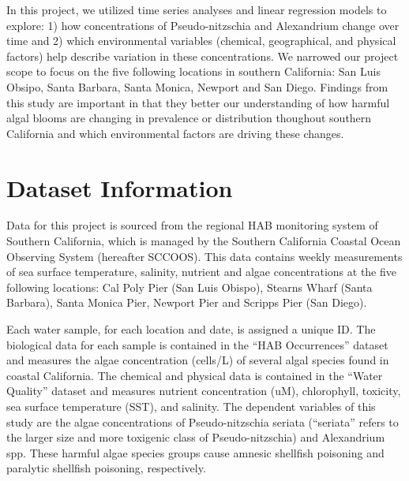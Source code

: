 \documentclass[
  12pt,
]{article}
\begin{document}
In this project, we utilized time series analyses and linear regression
models to explore: 1) how concentrations of Pseudo-nitzschia and
Alexandrium change over time and 2) which environmental variables
(chemical, geographical, and physical factors) help describe variation
in these concentrations. We narrowed our project scope to focus on the
five following locations in southern California: San Luis Obsipo, Santa
Barbara, Santa Monica, Newport and San Diego. Findings from this study
are important in that they better our understanding of how harmful algal
blooms are changing in prevalence or distribution thoughout southern
California and which environmental factors are driving these changes.

\newpage

\hypertarget{dataset-information}{%
\section{Dataset Information}\label{dataset-information}}

Data for this project is sourced from the regional HAB monitoring system
of Southern California, which is managed by the Southern California
Coastal Ocean Observing System (hereafter SCCOOS). This data contains
weekly measurements of sea surface temperature, salinity, nutrient and
algae concentrations at the five following locations: Cal Poly Pier (San
Luis Obispo), Stearns Wharf (Santa Barbara), Santa Monica Pier, Newport
Pier and Scripps Pier (San Diego).

Each water sample, for each location and date, is assigned a unique ID.
The biological data for each sample is contained in the ``HAB
Occurrences'' dataset and measures the algae concentration (cells/L) of
several algal species found in coastal California. The chemical and
physical data is contained in the ``Water Quality'' dataset and measures
nutrient concentration (uM), chlorophyll, toxicity, sea surface
temperature (SST), and salinity. The dependent variables of this study
are the algae concentrations of Pseudo-nitzschia seriata (``seriata''
refers to the larger size and more toxigenic class of Pseudo-nitzschia)
and Alexandrium spp. These harmful algae species groups cause amnesic
shellfish poisoning and paralytic shellfish poisoning, respectively.
\end{document}
